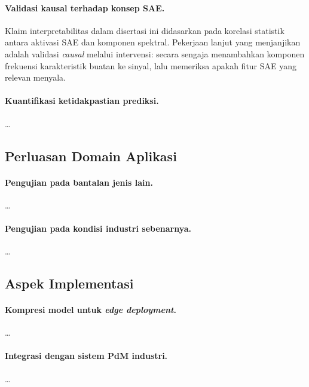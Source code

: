 \paragraph{Validasi kausal terhadap konsep SAE.}
Klaim interpretabilitas dalam disertasi ini didasarkan pada korelasi
statistik antara aktivasi SAE dan komponen spektral. Pekerjaan lanjut
yang menjanjikan adalah validasi \emph{causal} melalui intervensi:
secara sengaja menambahkan komponen frekuensi karakteristik buatan ke
sinyal, lalu memeriksa apakah fitur SAE yang relevan menyala.

\paragraph{Kuantifikasi ketidakpastian prediksi.}
\dots

\subsection{Perluasan Domain Aplikasi}
\label{subsec:bab6_saran_domain}

\paragraph{Pengujian pada bantalan jenis lain.}
\dots

\paragraph{Pengujian pada kondisi industri sebenarnya.}
\dots

\subsection{Aspek Implementasi}
\label{subsec:bab6_saran_impl}

\paragraph{Kompresi model untuk \emph{edge deployment}.}
\dots

\paragraph{Integrasi dengan sistem PdM industri.}
\dots
